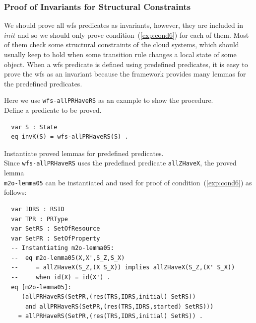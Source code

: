 \documentclass[12pt]{report}
\begin{document}
\subsubsection*{Proof of Invariants for Structural Constraints}
We should prove all wfs predicates as invariants, however, they are
included in $init$ and so we should only prove
condition~(\ref{exp:cond6}) for each of them. Most of them check some
structural constraints of the cloud systems, which should usually keep
to hold when some transition rule changes a local state of some
object. When a wfs predicate is defined using predefined predicates, it
is easy to prove the wfs as an invariant because the framework
provides many lemmas for the predefined predicates.

Here we use {\tt wfs-allPRHaveRS} as an example to show the procedure.\\

 Define a predicate to be proved. 
\begin{verbatim}
  var S : State
  eq invK(S) = wfs-allPRHaveRS(S) .
\end{verbatim}

 Instantiate proved lemmas for predefined
predicates. \\ Since {\tt wfs-allPRHaveRS} uses the predefined
predicate {\tt allZHaveX}, the proved lemma \\ {\tt m2o-lemma05} can be
instantiated and used for proof of condition~(\ref{exp:cond6}) as
follows:
\begin{verbatim}
  var IDRS : RSID 
  var TPR : PRType
  var SetRS : SetOfResource
  var SetPR : SetOfProperty
  -- Instantiating m2o-lemma05:
  --  eq m2o-lemma05(X,X',S_Z,S_X) 
  --     = allZHaveX(S_Z,(X S_X)) implies allZHaveX(S_Z,(X' S_X))
  --     when id(X) = id(X') .
  eq [m2o-lemma05]:
     (allPRHaveRS(SetPR,(res(TRS,IDRS,initial) SetRS))
      and allPRHaveRS(SetPR,(res(TRS,IDRS,started) SetRS)))
    = allPRHaveRS(SetPR,(res(TRS,IDRS,initial) SetRS)) .
\end{verbatim}
\end{document}
